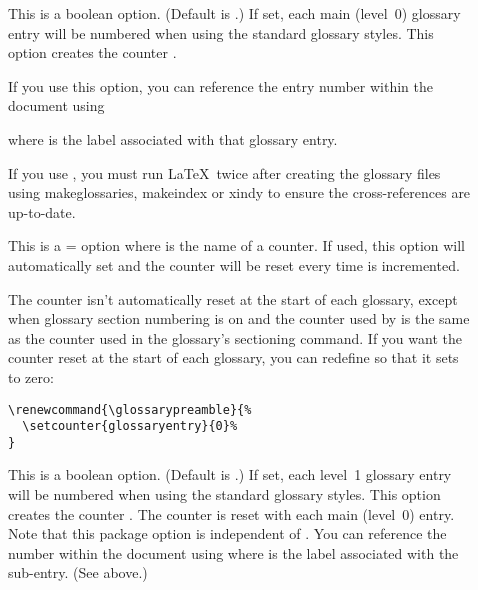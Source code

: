 \documentclass{nlctdoc}
\renewcommand*{\glossarypreamble}{%
\emph{This glossary style was setup using:}
\begin{ttfamily}
\begin{tabbing}
\cs{usepackage}[\=xindy,\\
\+\>nonumberlist,\\
  seeautonumberlist,\\
  toc,\\
  style=altlist]\{glossaries\}
\end{tabbing}
\cs{renewcommand*}\{\ics{glsgroupskip}\}\{\}\newline
\cs{renewcommand*}\{\ics{glsseeformat}\}[3][\ics{seename}]\{(\ics{xmakefirstuc}\{\#1\} \newline
\ics{glsseelist}\{\#2\}.)\}
\end{ttfamily}
}
\begin{document}
\begin{description}
\item[] This is a boolean option. (Default
is .) If set, each main (level~0)
glossary entry will be numbered when using the standard glossary
styles. This option creates the counter
.

If you use this option, you can reference the entry number
within the document using
\begin{definition}[\DescribeMacro{\glsrefentry}]
\end{definition}
where  is the label associated with that glossary entry.

\begin{important}
If you use , you must run \LaTeX\ twice after
creating the glossary files using \gls{makeglossaries},
\gls{makeindex} or \gls{xindy} to ensure the cross-references are
up-to-date.
\end{important}

\item[] This is a =
option where  is the name of a counter. If used, this
option will automatically set  and the
 counter will be reset every time  is
incremented.

\begin{important}
The  counter isn't automatically reset at the
start of each glossary, except when glossary section numbering is on
and the counter used by  is the same as the
counter used in the glossary's sectioning command. If you want
the counter reset at the start of each glossary, you can redefine
 so that it sets  to zero:
\begin{verbatim}
\renewcommand{\glossarypreamble}{%
  \setcounter{glossaryentry}{0}%
}
\end{verbatim}
\end{important}

\item[] This is a boolean option. (Default
is .) If set, each level~1
glossary entry will be numbered when using the standard glossary
styles. This option creates the counter
.
The counter is reset with each main (level~0) entry. Note that this
package option is independent of . You can
reference the number within the document using
 where  is the label
associated with the sub-entry. (See above.)


\end{description}
\end{document}
